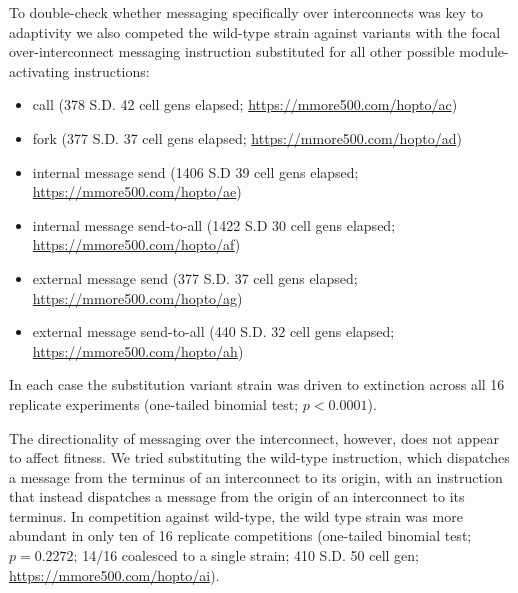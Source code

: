 To double-check whether messaging specifically over interconnects was key to adaptivity we also competed the wild-type strain against variants with the focal over-interconnect messaging instruction substituted for all other possible module-activating instructions:
\begin{itemize}
  \item call (378 S.D. 42 cell gens elapsed; \url{https://mmore500.com/hopto/ac})
  \item fork (377 S.D. 37 cell gens elapsed; \url{https://mmore500.com/hopto/ad})
  \item internal message send (1406 S.D 39 cell gens elapsed; \url{https://mmore500.com/hopto/ae})
  \item internal message send-to-all (1422 S.D 30 cell gens elapsed; \url{https://mmore500.com/hopto/af})
  \item external message send (377 S.D. 37 cell gens elapsed; \url{https://mmore500.com/hopto/ag})
  \item external message send-to-all (440 S.D. 32 cell gens elapsed; \url{https://mmore500.com/hopto/ah})
\end{itemize}
In each case the substitution variant strain was driven to extinction across all 16 replicate experiments (one-tailed binomial test; $p < 0.0001$).


The directionality of messaging over the interconnect, however, does not appear to affect fitness.
We tried substituting the wild-type instruction, which dispatches a message from the terminus of an interconnect to its origin, with an instruction that instead dispatches a message from the origin of an interconnect to its terminus.
In competition against wild-type, the wild type strain was more abundant in only ten of 16 replicate competitions (one-tailed binomial test; $p = 0.2272$; 14/16 coalesced to a single strain; 410 S.D. 50 cell gen; \url{https://mmore500.com/hopto/ai}).

